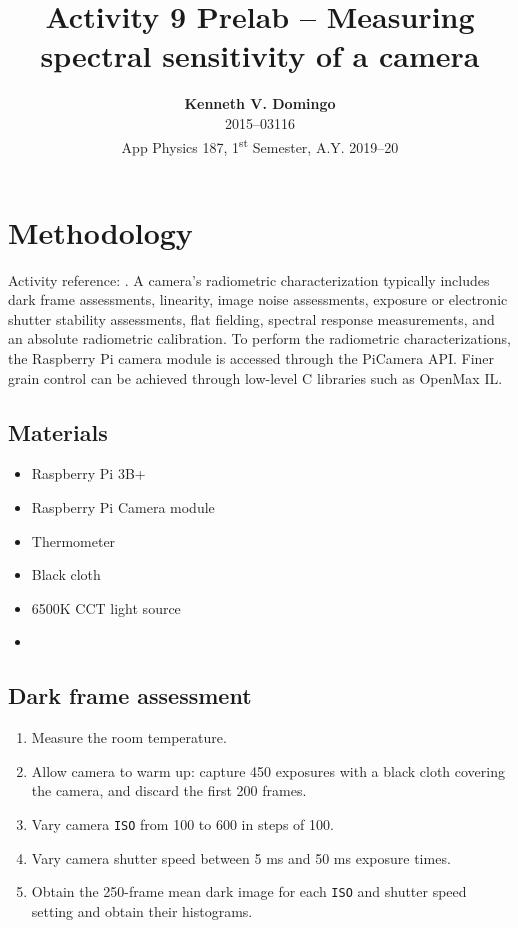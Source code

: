 \documentclass[12pt,a4paper]{article}
\newcommand{\activity}{Activity 9 Prelab -- Measuring spectral sensitivity of a camera}
\begin{document}
\title{\TitleFont \activity}
\author[ ]{\textbf{Kenneth V. Domingo} \\
2015--03116 \\
App Physics 187, 1\textsuperscript{st} Semester, A.Y. 2019--20}

\maketitle
\thispagestyle{titlestyle}

\section*{Methodology}
\setcounter{section}{1}
Activity reference: \cite{soriano, raspi}. A camera's radiometric characterization typically includes dark frame assessments, linearity, image noise assessments, exposure or electronic shutter stability assessments, flat fielding, spectral response measurements, and an absolute radiometric calibration. To perform the radiometric characterizations, the Raspberry Pi camera module is accessed through the PiCamera API. Finer grain control can be achieved through low-level C libraries such as OpenMax IL.

\subsection{Materials}
\begin{itemize}
	\item Raspberry Pi 3B+
	\item Raspberry Pi Camera module
	\item Thermometer
	\item Black cloth
	\item 6500K CCT light source
	\item 
\end{itemize}

\subsection{Dark frame assessment}
\begin{enumerate}
	\item Measure the room temperature.
	\item Allow camera to warm up: capture 450 exposures with a black cloth covering the camera, and discard the first 200 frames.
	\item Vary camera \texttt{ISO} from 100 to 600 in steps of 100.
	\item Vary camera shutter speed between 5 ms and 50 ms exposure times.
	\item Obtain the 250-frame mean dark image for each \texttt{ISO} and shutter speed setting and obtain their histograms.
\end{enumerate}
\end{document}
